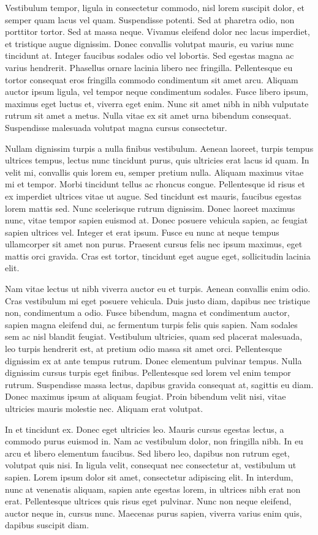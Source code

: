 \documentclass[a4paper,12pt,twoside]{article}
\begin{document}
\begin{multicols}{2}
Vestibulum tempor, ligula in consectetur commodo, nisl lorem suscipit dolor, et semper quam lacus vel quam. Suspendisse potenti. Sed at pharetra odio, non porttitor tortor. Sed at massa neque. Vivamus eleifend dolor nec lacus imperdiet, et tristique augue dignissim. Donec convallis volutpat mauris, eu varius nunc tincidunt at. Integer faucibus sodales odio vel lobortis. Sed egestas magna ac varius hendrerit. Phasellus ornare lacinia libero nec fringilla. Pellentesque eu tortor consequat eros fringilla commodo condimentum sit amet arcu. Aliquam auctor ipsum ligula, vel tempor neque condimentum sodales. Fusce libero ipsum, maximus eget luctus et, viverra eget enim. Nunc sit amet nibh in nibh vulputate rutrum sit amet a metus. Nulla vitae ex sit amet urna bibendum consequat. Suspendisse malesuada volutpat magna cursus consectetur.

Nullam dignissim turpis a nulla finibus vestibulum. Aenean laoreet, turpis tempus ultrices tempus, lectus nunc tincidunt purus, quis ultricies erat lacus id quam. In velit mi, convallis quis lorem eu, semper pretium nulla. Aliquam maximus vitae mi et tempor. Morbi tincidunt tellus ac rhoncus congue. Pellentesque id risus et ex imperdiet ultrices vitae ut augue. Sed tincidunt est mauris, faucibus egestas lorem mattis sed. Nunc scelerisque rutrum dignissim. Donec laoreet maximus nunc, vitae tempor sapien euismod at. Donec posuere vehicula sapien, ac feugiat sapien ultrices vel. Integer et erat ipsum. Fusce eu nunc at neque tempus ullamcorper sit amet non purus. Praesent cursus felis nec ipsum maximus, eget mattis orci gravida. Cras est tortor, tincidunt eget augue eget, sollicitudin lacinia elit.

Nam vitae lectus ut nibh viverra auctor eu et turpis. Aenean convallis enim odio. Cras vestibulum mi eget posuere vehicula. Duis justo diam, dapibus nec tristique non, condimentum a odio. Fusce bibendum, magna et condimentum auctor, sapien magna eleifend dui, ac fermentum turpis felis quis sapien. Nam sodales sem ac nisl blandit feugiat. Vestibulum ultricies, quam sed placerat malesuada, leo turpis hendrerit est, at pretium odio massa sit amet orci. Pellentesque dignissim ex at ante tempus rutrum. Donec elementum pulvinar tempus. Nulla dignissim cursus turpis eget finibus. Pellentesque sed lorem vel enim tempor rutrum. Suspendisse massa lectus, dapibus gravida consequat at, sagittis eu diam. Donec maximus ipsum at aliquam feugiat. Proin bibendum velit nisi, vitae ultricies mauris molestie nec. Aliquam erat volutpat.

In et tincidunt ex. Donec eget ultricies leo. Mauris cursus egestas lectus, a commodo purus euismod in. Nam ac vestibulum dolor, non fringilla nibh. In eu arcu et libero elementum faucibus. Sed libero leo, dapibus non rutrum eget, volutpat quis nisi. In ligula velit, consequat nec consectetur at, vestibulum ut sapien. Lorem ipsum dolor sit amet, consectetur adipiscing elit. In interdum, nunc at venenatis aliquam, sapien ante egestas lorem, in ultrices nibh erat non erat. Pellentesque ultrices quis risus eget pulvinar. Nunc non neque eleifend, auctor neque in, cursus nunc. Maecenas purus sapien, viverra varius enim quis, dapibus suscipit diam.


\end{multicols}
\end{document}
